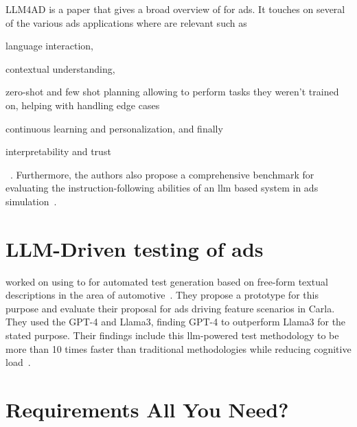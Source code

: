 LLM4AD is a paper that gives a broad overview of  for \acrlong{ads}. It touches on
several of the various \acrshort{ads} applications where  are relevant such as
\begin{inparaenum}
  \item language interaction,
  \item contextual understanding,
  \item zero-shot and few shot planning allowing  to perform tasks they weren't trained
  on, helping with handling edge cases
  \item continuous learning and personalization, and finally
  \item interpretability and trust \end{inparaenum}~\cite[2]{LLM4AD}. Furthermore, the authors
also propose a comprehensive benchmark for evaluating the instruction-following abilities of an
\acrshort{llm} based system in \acrshort{ads} simulation~\cite[1]{LLM4AD}.

\section{LLM-Driven testing of \acrshort{ads}}

\citeauthor{LLMDrivenTestingADS24} worked on using  to for automated test generation
based on free-form textual descriptions in the area of automotive~\cite[173]{LLMDrivenTestingADS24}.
They propose a prototype for this purpose and evaluate their proposal for \acrshort{ads} driving
feature scenarios in Carla. They used the  GPT-4 and Llama3, finding GPT-4 to
outperform Llama3 for the stated purpose. Their findings include this \acrshort{llm}-powered test
methodology to be more than \num{10} times faster than traditional methodologies while reducing
cognitive load~\cite[173]{LLMDrivenTestingADS24}.

\section{Requirements All You Need?}

